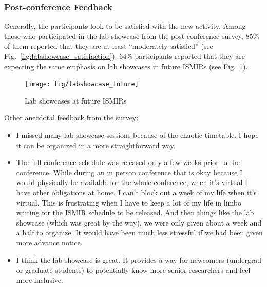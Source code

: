 \documentclass[%
10pt,								%
titlepage,						%
]
{scrartcl}
\begin{document}
        \subsubsection{Post-conference Feedback}
            Generally, the participants look to be satisfied with the new activity. Among those who participated in the lab showcase from the post-conference survey, 85\% of them reported that they are at least ``moderately satisfied'' (see Fig.~\ref{fig:labshowcase_satisfaction}). 64\% participants reported that they are expecting the same emphasis on lab showcases in future ISMIRs (see Fig.~\ref{fig:labshowcase_future}).
        \begin{figure}%
            \centering
            \texttt{[image: fig/labshowcase\_future]}%
            \caption{Lab showcases at future ISMIRs}%
            \label{fig:labshowcase_future}%
        \end{figure}
        
        Other anecdotal feedback from the survey:
        \begin{itemize}
            \item I missed many lab showcase sessions because of the chaotic timetable. I hope it can be organized in a more straightforward way.
            \item   The full conference schedule was released only a few weeks prior to the conference. While during an in person conference that is okay because I would physically be available for the whole conference, when it's virtual I have other obligations at home. I can't block out a week of my life when it's virtual. This is frustrating when I have to keep a lot of my life in limbo waiting for the ISMIR schedule to be released. And then things like the lab showcase (which was great by the way), we were only given about a week and a half to organize. It would have been much less stressful if we had been given more advance notice.
            \item   I think the lab showcase is great. It provides a way for newcomers (undergrad or graduate students) to potentially know more senior researchers and feel more inclusive.
        \end{itemize}
            
\end{document}
